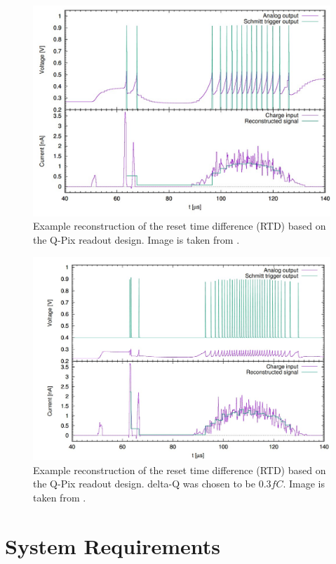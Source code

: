 \begin{figure}[]
\centering
\includegraphics[width=\textwidth]{images/qpix_rtd_reconstruction_example.jpg}
\caption{Example reconstruction of the reset time difference (RTD) based on the Q-Pix readout design. Image is taken from \citep{qpix:nygren:mei}.}
\end{figure}

\begin{figure}[]
\centering
\includegraphics[width=\textwidth]{images/qpix_rtd_reconstruction_example_03fc.jpg}
\caption{Example reconstruction of the reset time difference (RTD) based on the Q-Pix readout design. delta-Q was chosen to be $0.3 fC$. Image is taken from \citep{qpix:nygren:mei}.}
\end{figure}

\section{System Requirements}

